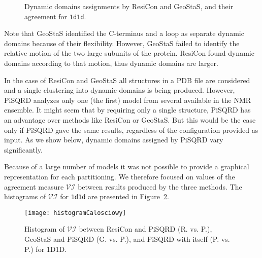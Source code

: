 \documentclass[a4paper,11pt,twoside]{book}%
\begin{document}
\begin{appendices}
\begin{figure}[h!]
\begin{minipage}{\linewidth}
\begin{minipage}{0.9\linewidth}
\begin{minipage}{\linewidth}
\end{minipage}
\end{minipage}
\end{minipage}
\caption{Dynamic domains assignments by ResiCon and GeoStaS, and their agreement for \texttt{1d1d}.}
\label{1d1dResiConVsGeoStaS}
\end{figure}

Note that GeoStaS identified the C-terminus and a loop as separate dynamic domains because of their flexibility.
However, GeoStaS failed to identify the relative motion of the two large subunits of the protein.
ResiCon found dynamic domains according to that motion, thus dynamic domains are larger.

In the case of ResiCon and GeoStaS all structures in a PDB file are considered and a single clustering into dynamic domains is being produced.
However, PiSQRD analyzes only one (the first) model from several available in the NMR ensemble.
It might seem that by requiring only a single structure, PiSQRD has an advantage over methods like ResiCon or GeoStaS.
But this would be the case only if PiSQRD gave the same results, regardless of the configuration provided as input.
As we show below, dynamic domains assigned by PiSQRD vary significantly.

Because of a large number of models it was not possible to provide a graphical representation for each partitioning.
We therefore focused on values of the agreement measure $\mathcal{VI}$ between results produced by the three methods.
The histograms of $\mathcal{VI}$ for \texttt{1d1d} are presented in Figure~\ref{histogram}.

\begin{figure}[h!]
\begin{center}
\texttt{[image: histogramCalosciowy]}
\caption{Histogram of $\mathcal{VI}$ between ResiCon and PiSQRD (R. vs. P.), GeoStaS and PiSQRD (G. vs. P.), and PiSQRD with itself (P. vs. P.) for 1D1D.}
\label{histogram}
\end{center}
\end{figure}



\end{appendices}
\end{document}
